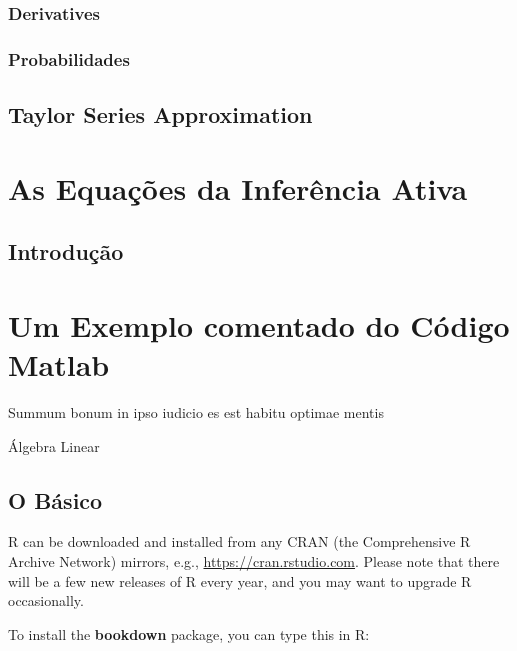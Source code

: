 \documentclass[
]{book}
\begin{document}
\hypertarget{derivatives}{%
\subsection{Derivatives}\label{derivatives}}

\hypertarget{probabilidades}{%
\subsection{Probabilidades}\label{probabilidades}}

\hypertarget{taylor-series-approximation}{%
\section{Taylor Series Approximation}\label{taylor-series-approximation}}

\hypertarget{as-equauxe7uxf5es-da-inferuxeancia-ativa}{%
\chapter{As Equações da Inferência Ativa}\label{as-equauxe7uxf5es-da-inferuxeancia-ativa}}

\hypertarget{introduuxe7uxe3o-3}{%
\section{Introdução}\label{introduuxe7uxe3o-3}}

\hypertarget{um-exemplo-comentado-do-cuxf3digo-matlab}{%
\chapter{Um Exemplo comentado do Código Matlab}\label{um-exemplo-comentado-do-cuxf3digo-matlab}}

Summum bonum in ipso iudicio es est habitu optimae mentis

Álgebra Linear

\hypertarget{o-buxe1sico-1}{%
\section{O Básico}\label{o-buxe1sico-1}}

R can be downloaded and installed from any CRAN (the Comprehensive R Archive Network) mirrors, e.g., \url{https://cran.rstudio.com}. Please note that there will be a few new releases of R every year, and you may want to upgrade R occasionally.

To install the \textbf{bookdown} package, you can type this in R:

  
\end{document}
